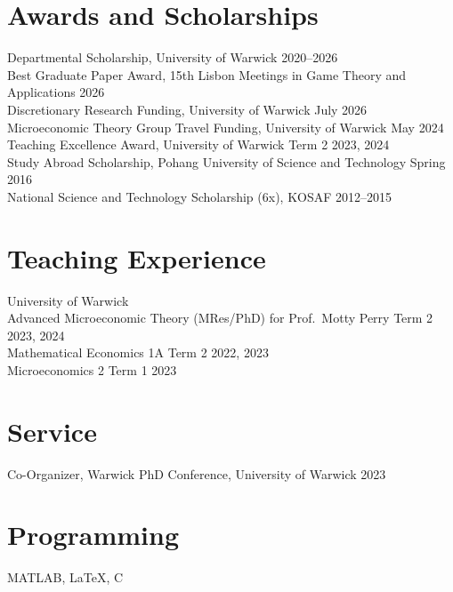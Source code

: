 \documentclass[11pt]{article}
\begin{document}


\section*{Awards and Scholarships}
Departmental Scholarship, University of Warwick \hfill 2020--2026\\
Best Graduate Paper Award, 15th Lisbon Meetings in Game Theory and Applications \hfill  2026\\
Discretionary Research Funding, University of Warwick \hfill July 2026\\
Microeconomic Theory Group Travel Funding, University of Warwick \hfill May 2024\\
Teaching Excellence Award, University of Warwick \hfill Term 2 2023, 2024\\
Study Abroad Scholarship, Pohang University of Science and Technology \hfill Spring 2016\\
National Science and Technology Scholarship (6x), KOSAF \hfill 2012--2015


\section*{Teaching Experience}

University of Warwick\\
Advanced Microeconomic Theory (MRes/PhD) for Prof.\ Motty Perry 
\hfill Term 2 2023, 2024\\
Mathematical Economics 1A 
 \hfill Term 2 2022, 2023\\
Microeconomics 2 %
 \hfill  Term 1 2023

\section*{Service}
Co-Organizer, Warwick PhD Conference, University of Warwick \hfill 2023


\section*{Programming}
MATLAB, \LaTeX{}, C
\end{document}
